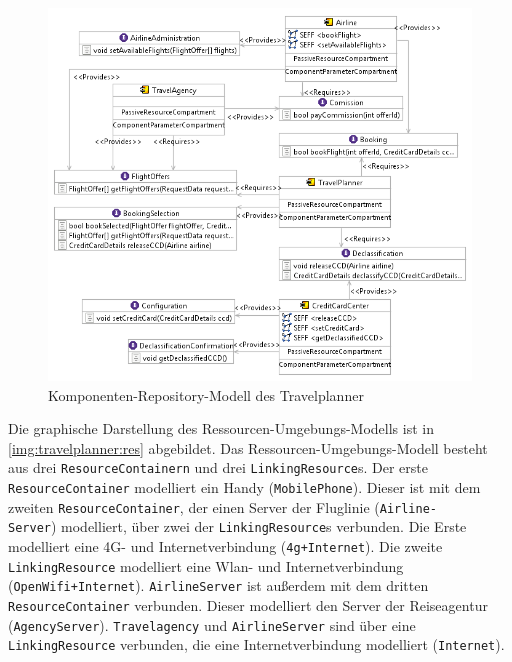 \begin{figure}[h]
	\centering
  	\includegraphics[width=1\textwidth]{images/travelplanner_repository.png}
	\caption{Komponenten-Repository-Modell des Travelplanner}
	\label{img:travelplanner:repo}
\end{figure} 
Die graphische Darstellung des Ressourcen-Umgebungs-Modells ist in \autoref{img:travelplanner:res} abgebildet.
Das Ressourcen-Umgebungs-Modell besteht aus drei \texttt{ResourceContainern} und drei \texttt{LinkingResource}s. Der erste \texttt{ResourceContainer} modelliert ein Handy (\texttt{MobilePhone}). Dieser ist mit dem zweiten \texttt{ResourceContainer}, der einen Server der Fluglinie (\texttt{Airline-\\Server}) modelliert, über zwei der \texttt{LinkingResource}s verbunden. Die Erste modelliert eine 4G- und Internetverbindung (\texttt{4g+Internet}). Die zweite \texttt{LinkingResource} modelliert eine Wlan- und Internetverbindung (\texttt{OpenWifi+Internet}). \texttt{AirlineServer} ist außerdem mit dem dritten \texttt{ResourceContainer} verbunden. Dieser modelliert den Server der Reiseagentur (\texttt{AgencyServer}). \texttt{Travelagency} und \texttt{AirlineServer} sind über eine \texttt{LinkingResource} verbunden, die eine Internetverbindung modelliert (\texttt{Internet}). \par
